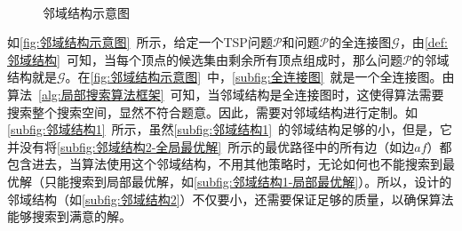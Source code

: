 \begin{figure}[htb]
     \\
    \caption[邻域结构示意图]{邻域结构示意图}
    \label{fig:邻域结构示意图}
\end{figure}
\par
如\autoref{fig:邻域结构示意图}~所示，给定一个TSP问题$\mathcal{P}$和问题$\mathcal{P}$的全连接图$\mathcal{G}$，由\autoref{def:邻域结构}~可知，当每个顶点的候选集由剩余所有顶点组成时，那么问题$\mathcal{P}$的邻域结构就是$\mathcal{G}$。在\autoref{fig:邻域结构示意图}~中，\autoref{subfig:全连接图}~就是一个全连接图。由算法~\ref{alg:局部搜索算法框架}~可知，当邻域结构是全连接图时，这使得算法需要搜索整个搜索空间，显然不符合题意。因此，需要对邻域结构进行定制。如\autoref{subfig:邻域结构1}~所示，虽然\autoref{subfig:邻域结构1}~的邻域结构足够的小，但是，它并没有将\autoref{subfig:邻域结构2-全局最优解}~所示的最优路径中的所有边（如边$af$）都包含进去，当算法使用这个邻域结构，不用其他策略时，无论如何也不能搜索到最优解（只能搜索到局部最优解，如\autoref{subfig:邻域结构1-局部最优解}）。所以，设计的邻域结构（如\autoref{subfig:邻域结构2}）不仅要小，还需要保证足够的质量，以确保算法能够搜索到满意的解。

